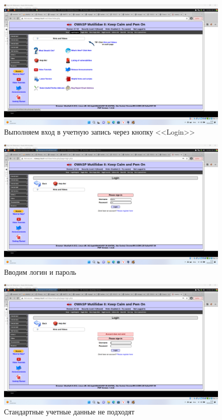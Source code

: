 \documentclass[a4paper]{article}
\begin{document}
  \begin{figure}[H]
    \centering
    \includegraphics[width=\textwidth]{Screenshot_16}
    \caption{Выполняем вход в учетную запись через кнопку <<Login>>}
  \end{figure}

  \begin{figure}[H]
    \centering
    \includegraphics[width=\textwidth]{Screenshot_17}
    \caption{Вводим логин и пароль}
  \end{figure}

  \begin{figure}[H]
    \centering
    \includegraphics[width=\textwidth]{Screenshot_18}
    \caption{Стандартные учетные данные не подходят}
  \end{figure}
\end{document}
